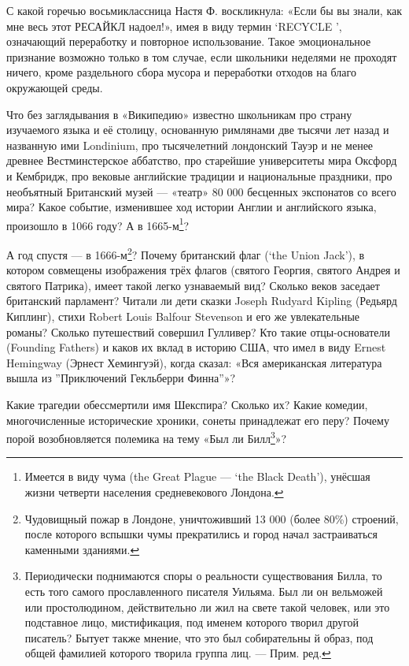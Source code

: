 С какой горечью восьмиклассница Настя Ф. воскликнула: «Если бы вы знали, как мне весь этот РЕСАЙКЛ надоел!», имея в виду термин ‘RECYCLE ’, означающий переработку и повторное использование. Такое эмоциональное признание возможно только в том случае, если школьники неделями не проходят ничего, кроме раздельного сбора мусора и переработки отходов на благо окружающей среды.

Что без заглядывания в «Википедию» известно школьникам про страну изучаемого языка и её столицу, основанную римлянами две тысячи лет назад и названную ими Londinium, про тысячелетний лондонский Тауэр и не менее древнее Вестминстерское аббатство, про старейшие университеты мира Оксфорд и Кембридж, про вековые английские традиции и национальные праздники, про необъятный Британский музей — «театр» 80 000 бесценных экспонатов со всего мира? Какое событие, изменившее ход истории Англии и английского языка, произошло в 1066 году? А в 1665-м\footnote{Имеется в виду чума (the Great Plague — ‘the Black Death’), унёсшая жизни четверти населения средневекового Лондона.}?

А год спустя — в 1666-м\footnote{Чудовищный пожар в Лондоне, уничтоживший 13 000 (более 80\%) строений, после которого вспышки чумы прекратились и город начал застраиваться каменными зданиями.}? Почему британский флаг (‘the Union Jack’), в котором совмещены изображения трёх флагов (святого Георгия, святого Андрея и святого Патрика), имеет такой легко узнаваемый вид? Сколько веков заседает британский парламент? Читали ли дети сказки Joseph Rudyard Kipling (Редьярд Киплинг), стихи Robert Louis Balfour Stevenson и его же увлекательные романы? Сколько путешествий совершил Гулливер? Кто такие отцы-основатели (Founding Fathers) и каков их вклад в историю США, что имел в виду Ernest Hemingway (Эрнест Хемингуэй), когда сказал: «Вся американская литература вышла из ''Приключений Гекльберри Финна''»?

Какие трагедии обессмертили имя Шекспира? Сколько их? Какие комедии, многочисленные исторические хроники, сонеты принадлежат его перу? Почему порой возобновляется полемика на тему «Был ли Билл\footnote{Периодически поднимаются споры о реальности существования Билла, то есть того самого прославленного писателя Уильяма. Был ли он вельможей или простолюдином, действительно ли жил на свете такой человек, или это подставное лицо, мистификация, под именем которого творил другой писатель? Бытует также мнение, что это был собирательны й образ, под общей фамилией которого творила группа лиц. — Прим. ред.}»?

